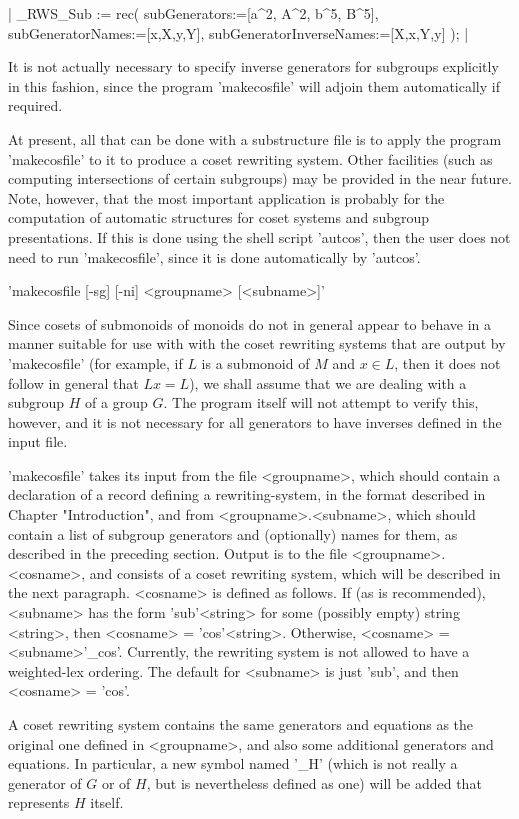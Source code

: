 |
_RWS_Sub := rec(
  subGenerators:=[a^2, A^2, b^5, B^5],
  subGeneratorNames:=[x,X,y,Y],
  subGeneratorInverseNames:=[X,x,Y,y]
);
|

It is not actually necessary to specify inverse generators for subgroups
explicitly in this fashion, since the program 'makecosfile' will adjoin
them automatically if required.

At present, all that can be done with a substructure file is to apply the
program 'makecosfile' to it to produce a coset rewriting system.
Other facilities (such as computing intersections of certain subgroups)
may be provided in the near future. Note, however, that the most important
application is probably for the computation of automatic structures for coset
systems and subgroup presentations. If this is done using the shell script
'autcos', then the user does not need to run 'makecosfile', since it is done
automatically by 'autcos'.


'makecosfile [-sg] [-ni] <groupname> [<subname>]'

Since cosets of submonoids of monoids do not in general appear to behave
in a manner suitable for use with with the coset rewriting systems
that are output by 'makecosfile' (for example, if $L$ is a  submonoid of $M$
and $x \in L$, then it does not follow in general that $Lx=L$), we shall
assume that we are dealing with a subgroup $H$ of a group $G$. The program
itself will not attempt to verify this, however, and it is not necessary
for all generators to have inverses defined in the input file.

'makecosfile' takes its input from the file <groupname>, which should contain a
declaration of a record defining a rewriting-system, in the format described
in Chapter "Introduction", and from <groupname>.<subname>, which should
contain a list of subgroup generators and (optionally) names for them,
as described in the preceding section. Output is to the file
<groupname>.<cosname>, and consists of a coset rewriting system,
which will be described in the next paragraph. <cosname> is defined
as follows. If (as is recommended), <subname> has the form 'sub'<string>
for some (possibly empty) string <string>, then <cosname> =
'cos'<string>. Otherwise, <cosname> = <subname>'\_cos'.
Currently, the rewriting system is not allowed to have a weighted-lex ordering.
The default for <subname> is just 'sub', and then
<cosname> = 'cos'.

A coset rewriting system contains the same generators and equations as the
original one defined in <groupname>, and also some additional generators
and equations. In particular, a new symbol named '\_H' (which is not really
a generator of $G$ or of $H$, but is nevertheless defined as one)
will be added that represents $H$ itself.

